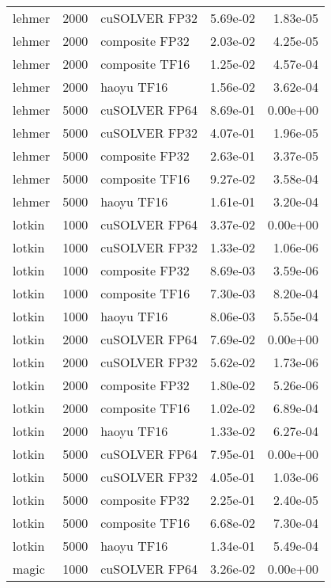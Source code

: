 \begin{table}
\begin{tabular}{lrlrr}
   lehmer &  2000 &  cuSOLVER FP32 &  5.69e-02 &        1.83e-05 \\
   lehmer &  2000 & composite FP32 &  2.03e-02 &        4.25e-05 \\
   lehmer &  2000 & composite TF16 &  1.25e-02 &        4.57e-04 \\
   lehmer &  2000 &     haoyu TF16 &  1.56e-02 &        3.62e-04 \\
   lehmer &  5000 &  cuSOLVER FP64 &  8.69e-01 &        0.00e+00 \\
   lehmer &  5000 &  cuSOLVER FP32 &  4.07e-01 &        1.96e-05 \\
   lehmer &  5000 & composite FP32 &  2.63e-01 &        3.37e-05 \\
   lehmer &  5000 & composite TF16 &  9.27e-02 &        3.58e-04 \\
   lehmer &  5000 &     haoyu TF16 &  1.61e-01 &        3.20e-04 \\
   lotkin &  1000 &  cuSOLVER FP64 &  3.37e-02 &        0.00e+00 \\
   lotkin &  1000 &  cuSOLVER FP32 &  1.33e-02 &        1.06e-06 \\
   lotkin &  1000 & composite FP32 &  8.69e-03 &        3.59e-06 \\
   lotkin &  1000 & composite TF16 &  7.30e-03 &        8.20e-04 \\
   lotkin &  1000 &     haoyu TF16 &  8.06e-03 &        5.55e-04 \\
   lotkin &  2000 &  cuSOLVER FP64 &  7.69e-02 &        0.00e+00 \\
   lotkin &  2000 &  cuSOLVER FP32 &  5.62e-02 &        1.73e-06 \\
   lotkin &  2000 & composite FP32 &  1.80e-02 &        5.26e-06 \\
   lotkin &  2000 & composite TF16 &  1.02e-02 &        6.89e-04 \\
   lotkin &  2000 &     haoyu TF16 &  1.33e-02 &        6.27e-04 \\
   lotkin &  5000 &  cuSOLVER FP64 &  7.95e-01 &        0.00e+00 \\
   lotkin &  5000 &  cuSOLVER FP32 &  4.05e-01 &        1.03e-06 \\
   lotkin &  5000 & composite FP32 &  2.25e-01 &        2.40e-05 \\
   lotkin &  5000 & composite TF16 &  6.68e-02 &        7.30e-04 \\
   lotkin &  5000 &     haoyu TF16 &  1.34e-01 &        5.49e-04 \\
    magic &  1000 &  cuSOLVER FP64 &  3.26e-02 &        0.00e+00 \\

\end{tabular}
\end{table}
